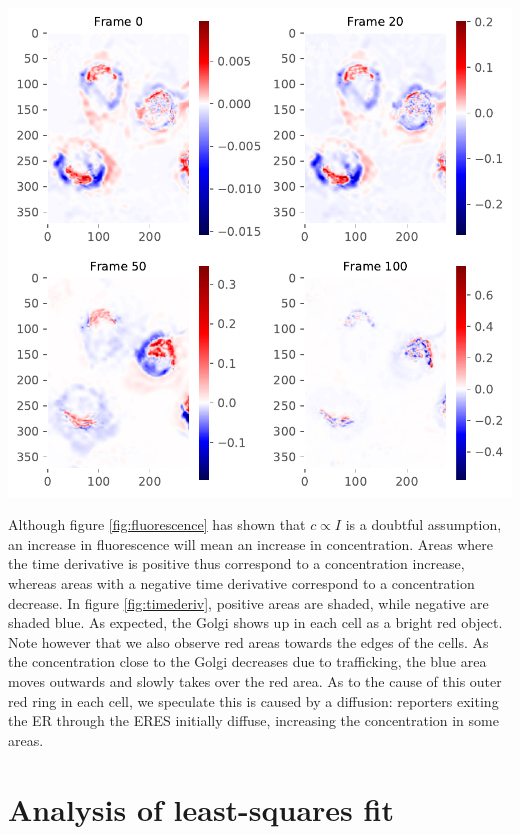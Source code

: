 \documentclass{Dissertate}
\let\origfigure\figure
\let\endorigfigure\endfigure
\renewenvironment{figure}[1][2] {
    \expandafter\origfigure\expandafter[H]
} {
    \endorigfigure
}
\begin{document}
\begin{figure}
\hypertarget{fig:timederiv}{%
\centering
\includegraphics{source/figures/pdf/time_deriv.pdf}
\caption{The determined time derivative four different frames of the
ManII RUSH experiments.\label{fig:timederiv}}
}
\end{figure}

Although figure \ref{fig:fluorescence} has shown that $c\propto I$ is a doubtful assumption, an increase in fluorescence will mean an increase in concentration. Areas where the time derivative is positive thus correspond to a concentration increase, whereas areas with a negative time derivative correspond to a concentration decrease. In figure \ref{fig:timederiv}, positive areas are shaded, while negative are shaded blue. As expected, the Golgi shows up in each
cell as a bright red object. Note however that we also observe red areas
towards the edges of the cells. As the concentration close to the Golgi
decreases due to trafficking, the blue area moves outwards and slowly takes over the red area. As to the cause of this outer red ring in each cell, we speculate this is caused by a diffusion: reporters exiting the ER through the ERES initially diffuse, increasing the concentration in some areas. 

\hypertarget{analysis-of-ls-fit}{%
\section{Analysis of least-squares fit}\label{analysis-of-ls-fit}}
\end{document}
